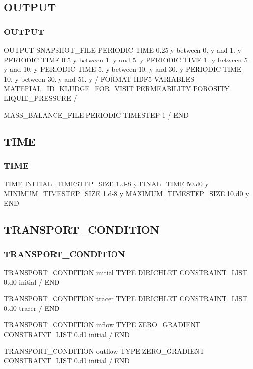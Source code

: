 \documentclass{beamer}
\begin{document}

\subsection{OUTPUT}
\begin{frame}\frametitle{OUTPUT}
	
	\begin{semiverbatim}
OUTPUT
  SNAPSHOT_FILE
    PERIODIC TIME 0.25 y between 0. y and 1. y
    PERIODIC TIME 0.5 y between 1. y and 5. y
    PERIODIC TIME 1. y between 5. y and 10. y
    PERIODIC TIME 5. y between 10. y and 30. y
    PERIODIC TIME 10. y between 30. y and 50. y
  /
  FORMAT HDF5
  VARIABLES
    MATERIAL_ID_KLUDGE_FOR_VISIT
    PERMEABILITY
    POROSITY
    LIQUID_PRESSURE
  /
  
  
  
  MASS_BALANCE_FILE
    PERIODIC TIMESTEP 1
  /
END
\end{semiverbatim}
\end{frame}


\subsection{TIME}
\begin{frame}\frametitle{TIME}
	
	\begin{semiverbatim}
		TIME
		  INITIAL_TIMESTEP_SIZE  1.d-8 y
		  FINAL_TIME 50.d0 y
		  MINIMUM_TIMESTEP_SIZE  1.d-8 y
		  MAXIMUM_TIMESTEP_SIZE 10.d0 y
		END
	\end{semiverbatim}
	
\end{frame}


\subsection{TRANSPORT\_CONDITION}
\begin{frame}\frametitle{TRANSPORT\_CONDITION}
	
	\begin{semiverbatim}
TRANSPORT_CONDITION initial
  TYPE DIRICHLET
  CONSTRAINT_LIST
    0.d0 initial
  /
END

TRANSPORT_CONDITION tracer
  TYPE DIRICHLET
  CONSTRAINT_LIST
    0.d0 tracer
  /
END



TRANSPORT_CONDITION inflow
  TYPE ZERO_GRADIENT
  CONSTRAINT_LIST
    0.d0 initial
  /
END

TRANSPORT_CONDITION outflow
  TYPE ZERO_GRADIENT
  CONSTRAINT_LIST
    0.d0 initial
  /
END
	\end{semiverbatim}
	
\end{frame}
\end{document}
